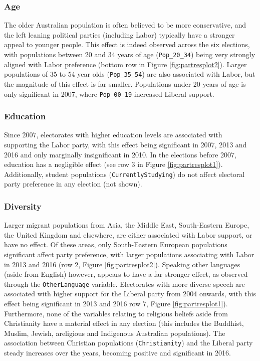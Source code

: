 \documentclass[times, doublespace]{anzsauth}
\begin{document}
\hypertarget{age}{%
\subsubsection*{Age}\label{age}}

The older Australian population is often believed to be more conservative, and the left leaning political parties (including Labor) typically have a stronger appeal to younger people. This effect is indeed observed across the six elections, with populations between 20 and 34 years of age (\texttt{Pop\_20\_34}) being very strongly aligned with Labor preference (bottom row in Figure \ref{fig:partresplot2}). Larger populations of 35 to 54 year olds (\texttt{Pop\_35\_54}) are also associated with Labor, but the magnitude of this effect is far smaller. Populations under 20 years of age is only significant in 2007, where \texttt{Pop\_00\_19} increased Liberal support.

\hypertarget{education}{%
\subsubsection*{Education}\label{education}}

Since 2007, electorates with higher education levels are associated with supporting the Labor party, with this effect being significant in 2007, 2013 and 2016 and only marginally insignificant in 2010. In the elections before 2007, education has a negligible effect (see row 3 in Figure \ref{fig:partresplot1}). Additionally, student populations (\texttt{CurrentlyStudying}) do not affect electoral party preference in any election (not shown).

\hypertarget{diversity}{%
\subsubsection*{Diversity}\label{diversity}}

Larger migrant populations from Asia, the Middle East, South-Eastern Europe, the United Kingdom and elsewhere, are either associated with Labor support, or have no effect. Of these areas, only South-Eastern European populations significant affect party preference, with larger populations associating with Labor in 2013 and 2016 (row 2, Figure \ref{fig:partresplot2}). Speaking other languages (aside from English) however, appears to have a far stronger effect, as observed through the \texttt{OtherLanguage} variable. Electorates with more diverse speech are associated with higher support for the Liberal party from 2004 onwards, with this effect being significant in 2013 and 2016 row 7, Figure \ref{fig:partresplot1}). Furthermore, none of the variables relating to religious beliefs aside from Christianity have a material effect in any election (this includes the Buddhist, Muslim, Jewish, areligious and Indigenous Australian populations). The association between Christian populations (\texttt{Christianity}) and the Liberal party steady increases over the years, becoming positive and significant in 2016.
\end{document}
